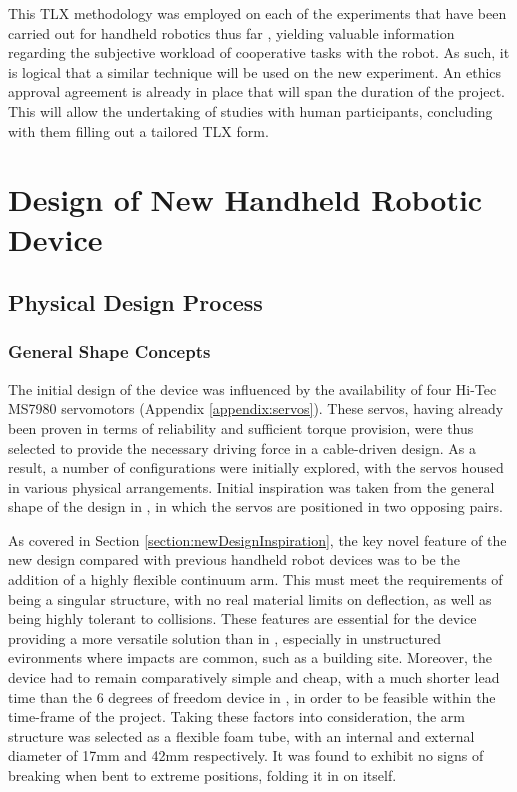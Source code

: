 \documentclass[11pt]{article}
\begin{document}
This TLX methodology was employed on each of the experiments that have been carried out for handheld robotics thus far \cite{GreggSmithDesign} \cite{GreggSmithFeedback}, yielding valuable information regarding the subjective workload of cooperative tasks with the robot. As such, it is logical that a similar technique will be used on the new experiment. An ethics approval agreement is already in place that will span the duration of the project. This will allow the undertaking of studies with human participants, concluding with them filling out a tailored TLX form. 
\pagebreak


\section{Design of New Handheld Robotic Device}

\subsection{Physical Design Process}
\subsubsection{General Shape Concepts}
The initial design of the device was influenced by the availability of four Hi-Tec MS7980 servomotors (Appendix \ref{appendix:servos}). These servos, having already been proven in terms of reliability and sufficient torque provision, were thus selected to provide the necessary driving force in a cable-driven design. As a result, a number of configurations were initially explored, with the servos housed in various physical arrangements. Initial inspiration was taken from the general shape of the design in \cite{GreggSmithDesign}, in which the servos are positioned in two opposing pairs.

As covered in Section \ref{section:newDesignInspiration}, the key novel feature of the new design compared with previous handheld robot devices was to be the addition of a highly flexible continuum arm. This must meet the requirements of being a singular structure, with no real material limits on deflection, as well as being highly tolerant to collisions. These features are essential for the device providing a more versatile solution than in \cite{GreggSmithDesign}, especially in unstructured evironments where impacts are common, such as a building site. Moreover, the device had to remain comparatively simple and cheap, with a much shorter lead time than the 6 degrees of freedom device in \cite{GreggSmithKinematics}, in order to be feasible within the time-frame of the project. Taking these factors into consideration, the arm structure was selected as a flexible foam tube, with an internal and external diameter of 17mm and 42mm respectively. It was found to exhibit no signs of breaking when bent to extreme positions, folding it in on itself.
\end{document}
